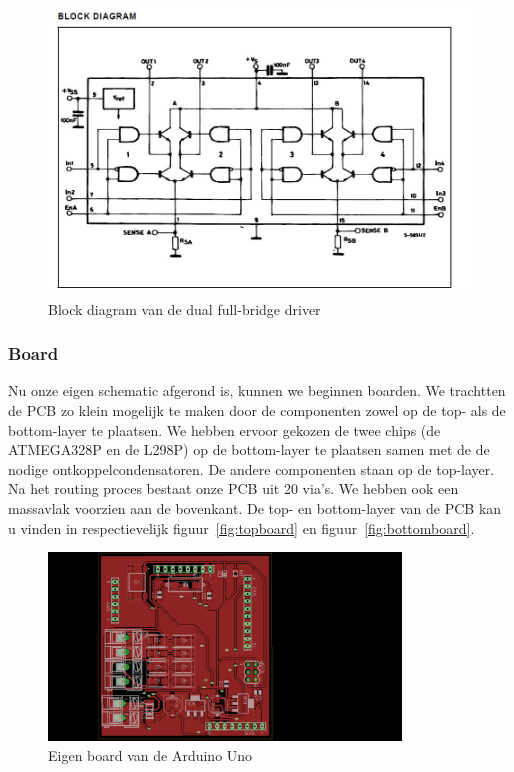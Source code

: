 \begin{figure}[H]
	\centering
	\includegraphics[width=\textheight, angle=90]{bridge.png}
	\caption{Block diagram van de dual full-bridge driver\label{fig:bridge}}
\end{figure}


\subsubsection{Board}
Nu onze eigen schematic afgerond is, kunnen we beginnen boarden. We trachtten de PCB zo klein mogelijk te maken door de componenten zowel op de top- als de bottom-layer te plaatsen. We hebben ervoor gekozen de twee chips (de ATMEGA328P en de L298P) op de bottom-layer te plaatsen samen met de de nodige ontkoppelcondensatoren. De andere componenten staan op de top-layer. Na het routing proces bestaat onze PCB uit 20 via's. We hebben ook een massavlak voorzien aan de bovenkant. De top- en bottom-layer van de PCB kan u vinden in respectievelijk figuur~\vref{fig:topboard} en figuur~\vref{fig:bottomboard}.

\begin{figure}[H]
	\centering
	\includegraphics[height=5cm]{topboard.png}
	\caption{Eigen board van de Arduino Uno\label{fig:topboard}}
\end{figure}

